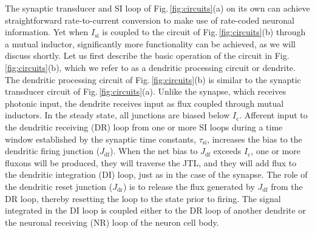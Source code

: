 \documentclass[twocolumn]{article}
\begin{document}
The synaptic transducer and SI loop of Fig.\,\ref{fig:circuits}(a) on its own can achieve straightforward rate-to-current conversion to make use of rate-coded neuronal information. Yet when $I_{\mathrm{si}}$ is coupled to the circuit of Fig.\,\ref{fig:circuits}(b) through a mutual inductor, significantly more functionality can be achieved, as we will discuss shortly. Let us first describe the basic operation of the circuit in Fig.\,\ref{fig:circuits}(b), which we refer to as a dendritic processing circuit or dendrite. The dendritic processing circuit of Fig.\,\ref{fig:circuits}(b) is similar to the synaptic transducer circuit of Fig.\,\ref{fig:circuits}(a). Unlike the synapse, which receives photonic input, the dendrite receives input as flux coupled through mutual inductors. In the steady state, all junctions are biased below $I_{\mathrm{c}}$. Afferent input to the dendritic receiving (DR) loop from one or more SI loops during a time window established by the synaptic time constants, $\tau_{\mathrm{si}}$, increases the bias to the dendritic firing junction ($J_{\mathrm{df}}$). When the net bias to $J_{\mathrm{df}}$ exceeds $I_{\mathrm{c}}$, one or more fluxons will be produced, they will traverse the JTL, and they will add flux to the dendritic integration (DI) loop, just as in the case of the synapse. The role of the dendritic reset junction ($J_{\mathrm{dr}}$) is to release the flux generated by $J_{\mathrm{df}}$ from the DR loop, thereby resetting the loop to the state prior to firing. The signal integrated in the DI loop is coupled either to the DR loop of another dendrite or the neuronal receiving (NR) loop of the neuron cell body.
\end{document}
